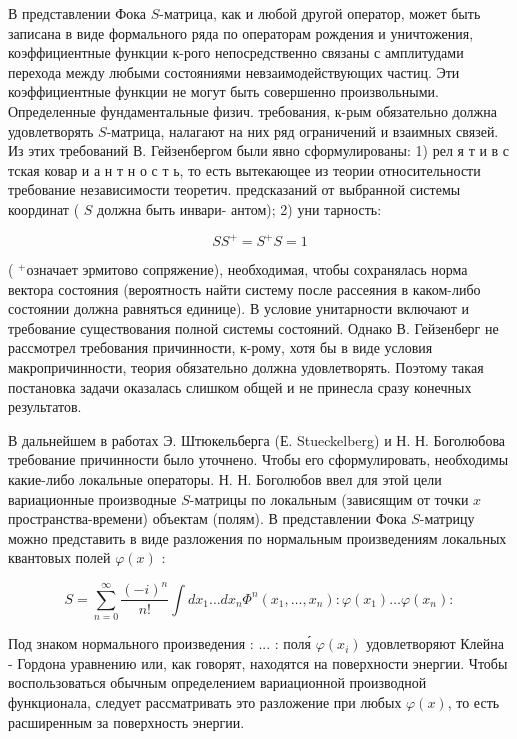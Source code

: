 \documentclass[10pt]{article}
\begin{document}
В представлении Фока $S$-матрица, как и любой другой оператор, может быть записана в виде формального ряда по операторам рождения и уничтожения, коэффициентные функции к-рого непосредственно связаны с амплитудами перехода между любыми состояниями невзаимодействующих частиц. Эти коэффициентные функции не могут быть совершенно произвольными. Определенные фундаментальные физич. требования, к-рым обязательно должна удовлетворять $S$-матрица, налагают на них ряд ограничений и взаимных связей. Из этих требований В. Гейзенбергом были явно сформулированы: 1) рел я т и в с тская ковар и а н т н о с т ь, то есть вытекающее из теории относительности требование независимости теоретич. предсказаний от выбранной системы координат ( $S$ должна быть инвари- антом); 2) уни тарность:



\[

S S^{+}=S^{+} S=1

\]



( ${ }^{+}$означает эрмитово сопряжение), необходимая, чтобы сохранялась норма вектора состояния (вероятность найти систему после рассеяния в каком-либо состоянии должна равняться единице). В условие унитарности включают и требование существования полной системы состояний. Однако В. Гейзенберг не рассмотрел требования причинности, к-рому, хотя бы в виде условия макропричинности, теория обязательно должна удовлетворять. Поэтому такая постановка задачи оказалась слишком общей и не принесла сразу конечных результатов.



В дальнейшем в работах Э. Штюкельберга (Е. Stueckelberg) и Н. Н. Боголюбова требование причинности было уточнено. Чтобы его сформулировать, необходимы какие-либо локальные операторы. Н. Н. Боголюбов ввел для этой цели вариационные производные $S$-матрицы по локальным (зависящим от точки $x$ пространства-времени) объектам (полям). В представлении Фока $S$-матрицу можно представить в виде разложения по нормальным произведениям локальных квантовых полей $\varphi(x)$ :



\[

S=\sum_{n=0}^{\infty} \frac{(-i)^{n}}{n !} \int d x_{1} \ldots d x_{n} \Phi^{n}\left(x_{1}, \ldots, x_{n}\right): \varphi\left(x_{1}\right) \ldots \varphi\left(x_{n}\right):

\]



Под знаком нормального произведения : ... : поля́ $\varphi\left(x_{i}\right)$ удовлетворяют Клейна - Гордона уравнению или, как говорят, находятся на поверхности энергии. Чтобы воспользоваться обычным определением вариационной производной функционала, следует рассматривать это разложение при любых $\varphi(x)$, то есть расширенным за поверхность энергии.
\end{document}
